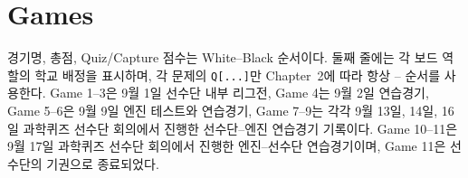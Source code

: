 \chapter{Games}

경기명, 총점, Quiz/Capture 점수는 White--Black 순서이다. 둘째 줄에는 각 보드 역할의 학교 배정을 표시하며, 각 문제의 \texttt{Q[...]}만 Chapter~2에 따라 항상 \POSTECH--\KAIST{} 순서를 사용한다. Game 1--3은 9월 1일 선수단 내부 리그전, Game 4는 9월 2일 연습경기, Game 5--6은 9월 9일 엔진 테스트와 연습경기, Game 7--9는 각각 9월 13일, 14일, 16일 과학퀴즈 선수단 회의에서 진행한 선수단--엔진 연습경기 기록이다. Game 10--11은 9월 17일 과학퀴즈 선수단 회의에서 진행한 엔진--선수단 연습경기이며, Game 11은 선수단의 기권으로 종료되었다.

\newenvironment{gamerecord}{\begingroup\small\setlength{\LTleft}{0pt}\setlength{\LTright}{0pt}\setlength{\LTpre}{0pt}\setlength{\LTpost}{0pt}\renewcommand{\arraystretch}{1.02}\begin{longtable}{@{}r@{\hspace{0.62em}}>{\ttfamily\raggedright\arraybackslash}p{0.895\textwidth}@{}}}{\end{longtable}\endgroup}
\newcommand{\schooldisplay}[1]{\ifstrequal{#1}{POSTECH}{\POSTECH}{\ifstrequal{#1}{KAIST}{\KAIST}{#1}}}
\newcommand{\gamehead}[7]{%
\Needspace{9\baselineskip}\par\vspace{1.05em}%
\noindent{\large\bfseries #1. #2--#3\hfill{\small\mdseries #4}\par}%
\vspace{0.18em}\noindent{\small White: \schooldisplay{#5} \textperiodcentered{} Black: \schooldisplay{#6}\par}%
\vspace{0.18em}\noindent{\small #7\par}%
\vspace{0.34em}\hrule height 0.4pt\vspace{0.34em}}

